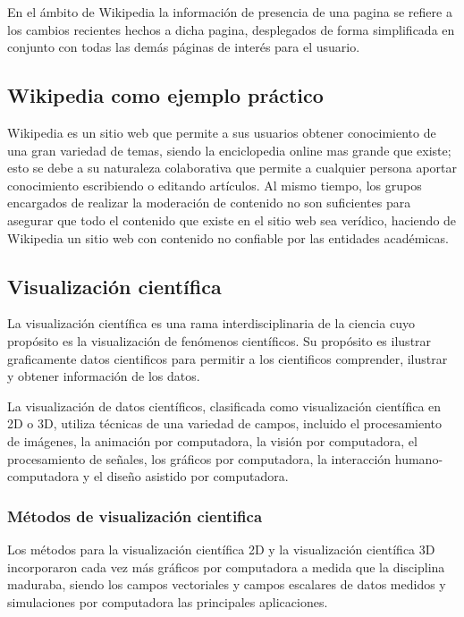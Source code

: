         En el ámbito de Wikipedia la información de presencia de una pagina se refiere a los cambios recientes hechos a dicha pagina, desplegados de forma simplificada en conjunto con todas las demás páginas de interés para el usuario.
       
    \subsection{Wikipedia como ejemplo práctico}

        Wikipedia es un sitio web que permite a sus usuarios obtener conocimiento de una gran variedad de temas, siendo la enciclopedia online mas grande que existe; esto se debe a su naturaleza colaborativa que permite a cualquier persona aportar conocimiento escribiendo o editando artículos. Al mismo tiempo, los grupos encargados de realizar la moderación de contenido no son suficientes para asegurar que todo el contenido que existe en el sitio web sea verídico, haciendo de Wikipedia un sitio web con contenido no confiable por las entidades académicas.

    \subsection{Visualización científica}

        La visualización científica es una rama interdisciplinaria de la ciencia cuyo propósito es la visualización de fenómenos científicos. Su propósito es ilustrar graficamente datos cientificos para permitir a los cientificos comprender, ilustrar y obtener información de los datos.

        La visualización de datos científicos, clasificada como visualización científica en 2D o 3D, utiliza técnicas de una variedad de campos, incluido el procesamiento de imágenes, la animación por computadora, la visión por computadora, el procesamiento de señales, los gráficos por computadora, la interacción humano-computadora y el diseño asistido por computadora.


    \subsubsection{Métodos de visualización cientifica}

        Los métodos para la visualización científica 2D y la visualización científica 3D incorporaron cada vez más gráficos por computadora a medida que la disciplina maduraba, siendo los campos vectoriales y campos escalares de datos medidos y simulaciones por computadora las principales aplicaciones.

